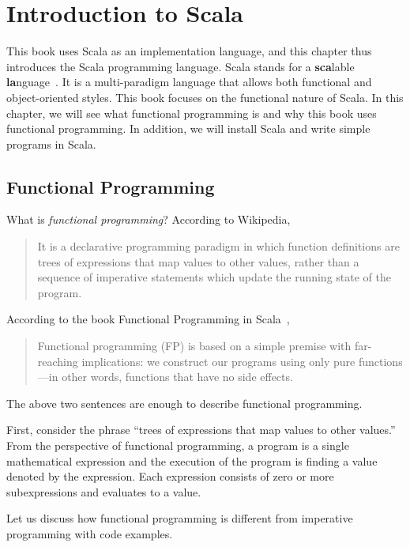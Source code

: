
\chapter{Introduction to Scala}

This book uses Scala as an implementation language, and
this chapter thus introduces the Scala programming language. Scala stands for a
\textbf{sca}lable \textbf{la}nguage~\cite{programming-in-scala}. It is a
multi-paradigm language that allows both functional and object-oriented styles.
This book focuses on the functional nature of Scala. In this chapter, we will
see what functional programming is and why this book uses functional
programming. In addition, we will install Scala and write simple programs in
Scala.

\section{Functional Programming}

What is \textit{functional programming}?
According to Wikipedia,

\begin{quote}
It is a declarative programming paradigm in which function definitions are trees
of expressions that map values to other values, rather than a sequence of
imperative statements which update the running state of the program.
\end{quote}

According to the book Functional Programming in Scala~\cite{fp-in-scala},

\begin{quote}
Functional programming (FP) is based on a simple premise with far-reaching
implications: we construct our programs using only pure functions---in other words,
functions that have no side effects.
\end{quote}

The above two sentences are enough to describe functional programming.

First, consider the phrase ``trees of expressions that map values to other
values.''
From the perspective of functional programming, a
program is a single mathematical expression and the execution of the program is
finding a value denoted by the expression.
Each expression consists of zero or more subexpressions and evaluates to a value.

Let us discuss how
functional programming is different from imperative programming with
code examples.


